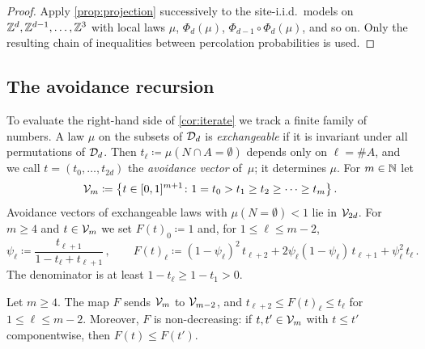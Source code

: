 \documentclass[11pt,letterpaper]{article}
\begin{document}
\begin{proof}
Apply \cref{prop:projection} successively to the site-i.i.d.\ models on $\mathbb Z^d,\mathbb Z^{d-1},\dots,\mathbb Z^3$ with local laws $\mu$, $\Phi_d(\mu)$, $\Phi_{d-1}\circ\Phi_d(\mu)$, and so on. Only the resulting chain of inequalities between percolation probabilities is used.
\end{proof}

\subsection{The avoidance recursion}\label{sec:recursion}

To evaluate the right-hand side of \cref{cor:iterate} we track a finite family of numbers. A law $\mu$ on the subsets of $\mathcal D_d$ is \emph{exchangeable} if it is invariant under all permutations of $\mathcal D_d$. Then $t_\ell\coloneqq\mu(N\cap A=\emptyset)$ depends only on $\ell=\#A$, and we call $t=(t_0,\dots,t_{2d})$ the \emph{avoidance vector} of~$\mu$; it determines $\mu$. For $m\in\mathbb N$ let
\begin{equation*}
\mathcal V_m\coloneqq\big\{t\in[0,1]^{m+1}\colon 1=t_0>t_1\ge t_2\ge\dots\ge t_m\big\}\,.
\end{equation*}
Avoidance vectors of exchangeable laws with $\mu(N=\emptyset)<1$ lie in $\mathcal V_{2d}$. For $m\ge4$ and $t\in\mathcal V_m$ we set $F(t)_0\coloneqq1$ and, for $1\le\ell\le m-2$,
\begin{equation}\label{eq:F}
\psi_\ell\coloneqq\frac{t_{\ell+1}}{1-t_\ell+t_{\ell+1}}\,,\qquad F(t)_\ell\coloneqq(1-\psi_\ell)^2\,t_{\ell+2}+2\psi_\ell(1-\psi_\ell)\,t_{\ell+1}+\psi_\ell^2\,t_\ell\,.
\end{equation}
The denominator is at least $1-t_\ell\ge1-t_1>0$.

\begin{lemma}[Monotonicity]\label{lem:monotone}
Let $m\ge4$. The map $F$ sends $\mathcal V_m$ to $\mathcal V_{m-2}$, and $t_{\ell+2}\le F(t)_\ell\le t_\ell$ for $1\le\ell\le m-2$. Moreover, $F$ is non-decreasing: if $t,t'\in\mathcal V_m$ with $t\le t'$ componentwise, then $F(t)\le F(t')$.
\end{lemma}
\end{document}
